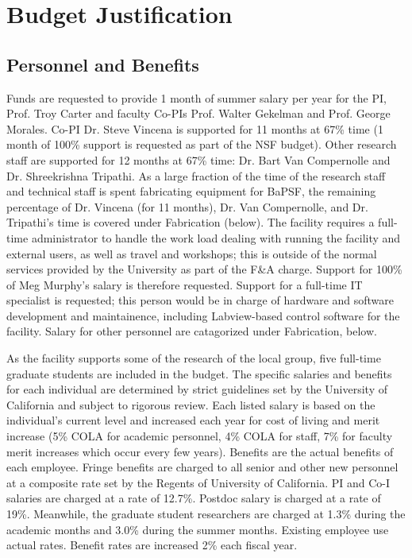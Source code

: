 \documentclass[11pt]{article}
\date{}
\begin{document}
\section*{Budget Justification}

\subsection*{Personnel and Benefits}

Funds are requested to provide 1 month of summer salary per year for
the PI, Prof. Troy Carter and faculty Co-PIs Prof. Walter Gekelman and
Prof. George Morales.  Co-PI Dr. Steve Vincena is supported for 11
months at 67\% time (1 month of 100\% support is requested as part of
the NSF budget).  Other research staff are supported for 12 months at
67\% time: Dr. Bart Van Compernolle and Dr. Shreekrishna Tripathi.  As
a large fraction of the time of the research staff and technical staff
is spent fabricating equipment for BaPSF, the remaining percentage of
Dr. Vincena (for 11 months), Dr. Van Compernolle, and Dr. Tripathi's
time is covered under Fabrication (below).  The facility requires a
full-time administrator to handle the work load dealing with running
the facility and external users, as well as travel and workshops; this
is outside of the normal services provided by the University as part
of the F\&A charge.  Support for 100\% of Meg Murphy's salary is
therefore requested.  Support for a full-time IT specialist is
requested; this person would be in charge of hardware and software
development and maintainence, including Labview-based control software
for the facility.  Salary for other personnel are catagorized under
Fabrication, below.

 As the facility supports some of the
research of the local group, five full-time graduate students are
included in the budget.  The specific salaries and benefits for each
individual are determined by strict guidelines set by the University
of California and subject to rigorous review. Each listed salary is
based on the individual’s current level and increased each year for
cost of living and merit increase (5\% COLA for academic personnel,
4\% COLA for staff, 7\% for faculty merit increases which occur every
few years). Benefits are the actual benefits of each employee.  Fringe
benefits are charged to all senior and other new personnel at a
composite rate set by the Regents of University of California.  PI and
Co-I salaries are charged at a rate of 12.7\%. Postdoc salary is
charged at a rate of 19\%. Meanwhile, the graduate student researchers
are charged at 1.3\% during the academic months and 3.0\% during the
summer months.  Existing employee use actual rates.  Benefit rates are
increased 2\% each fiscal year.
\end{document}
